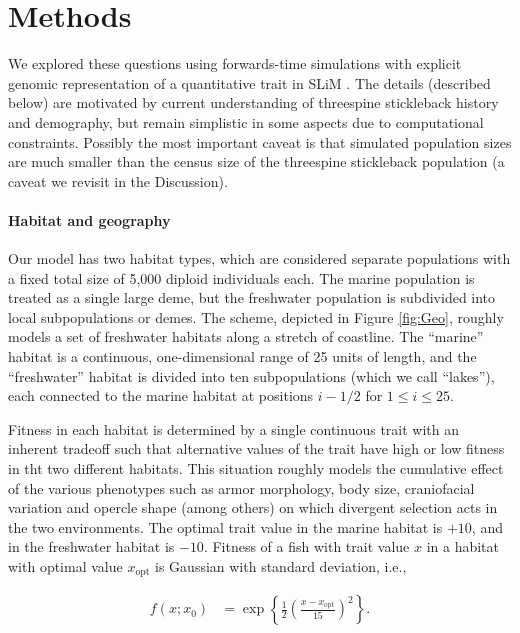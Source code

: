 \documentclass{article}
\begin{document}
\section*{Methods}

We explored these questions using forwards-time simulations with explicit genomic representation of a quantitative trait in SLiM \citep{haller2017slim,haller2018slim3}.
The details (described below) are motivated by current understanding of threespine stickleback history and demography, but remain simplistic in some aspects due to computational constraints.
Possibly the most important caveat is that simulated population sizes are much smaller than the census size of the threespine stickleback population
(a caveat we revisit in the Discussion).

\paragraph{Habitat and geography}
Our model has two habitat types, which are considered separate populations with a fixed total size of 5,000 diploid individuals each. 
The marine population is treated as a single large deme, but the freshwater population is subdivided into local subpopulations or demes. 
The scheme, depicted in Figure \ref{fig:Geo}, roughly models a set of freshwater habitats along a stretch of coastline. 
The ``marine'' habitat  is a continuous, one-dimensional range of 25 units of length, and the 
``freshwater'' habitat is divided into ten subpopulations (which we call ``lakes''), each connected to the marine habitat at positions $i - 1/2$ for $1 \le i \le 25$.

Fitness in each habitat is determined by a single continuous trait with an inherent tradeoff such that alternative values of the trait have high or low fitness in tht two different habitats. 
This situation roughly models the cumulative effect of the various phenotypes such as armor morphology, 
body size, craniofacial variation and opercle shape (among others) on which divergent selection acts in the two environments. 
The optimal trait value in the marine habitat is $+10$, and in the freshwater habitat is $-10$. 
Fitness of a fish with trait value $x$ in a habitat with optimal value $x_\text{opt}$ is Gaussian with standard deviation, i.e.,

\begin{align*}
    f(x; x_0)
    &=
    \exp\left\{
        \frac{1}{2}
            \left(
            \frac{x-x_\text{opt}}{15}
            \right)^2
        \right\} .
\end{align*}
\end{document}
